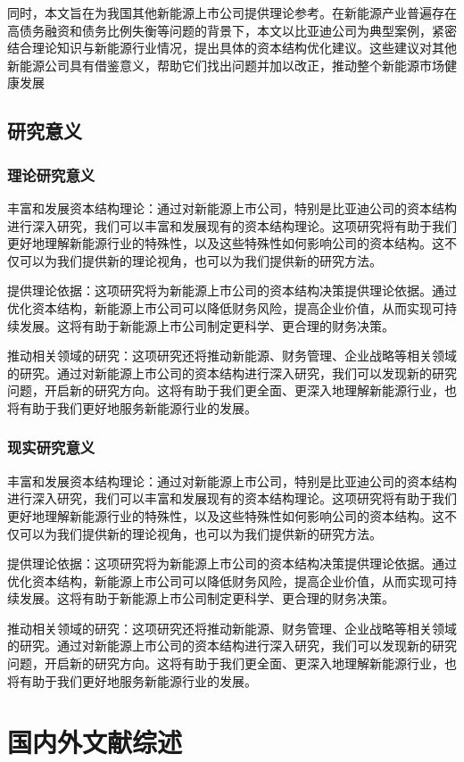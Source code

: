 同时，本文旨在为我国其他新能源上市公司提供理论参考。在新能源产业普遍存在高债务融资和债务比例失衡等问题的背景下，本文以比亚迪公司为典型案例，紧密结合理论知识与新能源行业情况，提出具体的资本结构优化建议。这些建议对其他新能源公司具有借鉴意义，帮助它们找出问题并加以改正，推动整个新能源市场健康发展
\subsection{研究意义}
\subsubsection{理论研究意义}
 丰富和发展资本结构理论：通过对新能源上市公司，特别是比亚迪公司的资本结构进行深入研究，我们可以丰富和发展现有的资本结构理论。这项研究将有助于我们更好地理解新能源行业的特殊性，以及这些特殊性如何影响公司的资本结构。这不仅可以为我们提供新的理论视角，也可以为我们提供新的研究方法。

提供理论依据：这项研究将为新能源上市公司的资本结构决策提供理论依据。通过优化资本结构，新能源上市公司可以降低财务风险，提高企业价值，从而实现可持续发展。这将有助于新能源上市公司制定更科学、更合理的财务决策。

推动相关领域的研究：这项研究还将推动新能源、财务管理、企业战略等相关领域的研究。通过对新能源上市公司的资本结构进行深入研究，我们可以发现新的研究问题，开启新的研究方向。这将有助于我们更全面、更深入地理解新能源行业，也将有助于我们更好地服务新能源行业的发展。
\subsubsection{现实研究意义}
丰富和发展资本结构理论：通过对新能源上市公司，特别是比亚迪公司的资本结构进行深入研究，我们可以丰富和发展现有的资本结构理论。这项研究将有助于我们更好地理解新能源行业的特殊性，以及这些特殊性如何影响公司的资本结构。这不仅可以为我们提供新的理论视角，也可以为我们提供新的研究方法。

提供理论依据：这项研究将为新能源上市公司的资本结构决策提供理论依据。通过优化资本结构，新能源上市公司可以降低财务风险，提高企业价值，从而实现可持续发展。这将有助于新能源上市公司制定更科学、更合理的财务决策。

推动相关领域的研究：这项研究还将推动新能源、财务管理、企业战略等相关领域的研究。通过对新能源上市公司的资本结构进行深入研究，我们可以发现新的研究问题，开启新的研究方向。这将有助于我们更全面、更深入地理解新能源行业，也将有助于我们更好地服务新能源行业的发展。

\section{国内外文献综述}